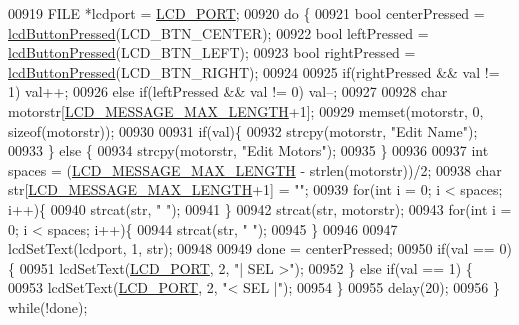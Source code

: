 \begin{DoxyCode}
{{{{{{{{{{{{{{00919     FILE *lcdport = \hyperlink{lcdmsg_8h_abcf42bd88b3c36193f301ca25b033875}{LCD\_PORT};
00920     \textcolor{keywordflow}{do} \{
00921         \textcolor{keywordtype}{bool} centerPressed = \hyperlink{lcddiag_8h_a74e4c744db49f9b7b645095575e152ad}{lcdButtonPressed}(LCD\_BTN\_CENTER);
00922         \textcolor{keywordtype}{bool} leftPressed = \hyperlink{lcddiag_8h_a74e4c744db49f9b7b645095575e152ad}{lcdButtonPressed}(LCD\_BTN\_LEFT);
00923         \textcolor{keywordtype}{bool} rightPressed = \hyperlink{lcddiag_8h_a74e4c744db49f9b7b645095575e152ad}{lcdButtonPressed}(LCD\_BTN\_RIGHT);
00924 
00925         \textcolor{keywordflow}{if}(rightPressed && val != 1) val++;
00926         \textcolor{keywordflow}{else} \textcolor{keywordflow}{if}(leftPressed && val != 0) val--;
00927 
00928         \textcolor{keywordtype}{char} motorstr[\hyperlink{lcdmsg_8h_abe4c4b70fc6f44ae3680e5b2c68cdd00}{LCD\_MESSAGE\_MAX\_LENGTH}+1];
00929         memset(motorstr, 0, \textcolor{keyword}{sizeof}(motorstr));
00930 
00931         \textcolor{keywordflow}{if}(val)\{
00932             strcpy(motorstr, \textcolor{stringliteral}{"Edit Name"});
00933         \} \textcolor{keywordflow}{else} \{
00934             strcpy(motorstr, \textcolor{stringliteral}{"Edit Motors"});
00935         \}
00936 
00937         \textcolor{keywordtype}{int} spaces = (\hyperlink{lcdmsg_8h_abe4c4b70fc6f44ae3680e5b2c68cdd00}{LCD\_MESSAGE\_MAX\_LENGTH} - strlen(motorstr))/2;
00938         \textcolor{keywordtype}{char} str[\hyperlink{lcdmsg_8h_abe4c4b70fc6f44ae3680e5b2c68cdd00}{LCD\_MESSAGE\_MAX\_LENGTH}+1] = \textcolor{stringliteral}{""};
00939         \textcolor{keywordflow}{for}(\textcolor{keywordtype}{int} i = 0; i < spaces; i++)\{
00940             strcat(str, \textcolor{stringliteral}{" "});
00941         \}
00942         strcat(str, motorstr);
00943         \textcolor{keywordflow}{for}(\textcolor{keywordtype}{int} i = 0; i < spaces; i++)\{
00944             strcat(str, \textcolor{stringliteral}{" "});
00945         \}
00946 
00947         lcdSetText(lcdport, 1, str);
00948 
00949         done = centerPressed;
00950         \textcolor{keywordflow}{if}(val == 0)\{
00951             lcdSetText(\hyperlink{lcdmsg_8h_abcf42bd88b3c36193f301ca25b033875}{LCD\_PORT}, 2, \textcolor{stringliteral}{"|      SEL     >"});
00952         \} \textcolor{keywordflow}{else} \textcolor{keywordflow}{if}(val == 1) \{
00953             lcdSetText(\hyperlink{lcdmsg_8h_abcf42bd88b3c36193f301ca25b033875}{LCD\_PORT}, 2, \textcolor{stringliteral}{"<      SEL     |"});
00954         \}
00955         delay(20);
00956     \} \textcolor{keywordflow}{while}(!done);
}}}}}}}}}}}}}}
\end{DoxyCode}
